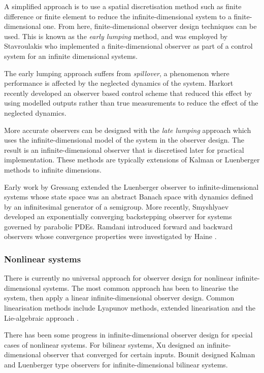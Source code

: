 A simplified approach is to use a spatial discretisation method such as finite difference or finite element to reduce the infinite-dimensional system to a finite-dimensional one. From here, finite-dimensional observer design techniques can be used. This is known as the \textit{early lumping} method, and was employed by Stavroulakis \cite{stavroulakis1973design} who implemented a finite-dimensional observer as part of a control system for an infinite dimensional systems.

The early lumping approach suffers from \textit{spillover}, a phenomenon where performance is affected by the neglected dynamics of the system\cite{meirovitch1983problem}. Harkort \cite{harkort2011finite} recently developed an observer based control scheme that reduced this effect by using modelled outputs rather than true measurements to reduce the effect of the neglected dynamics.

More accurate observers can be designed with the \textit{late lumping} approach which uses the infinite-dimensional model of the system in the observer design. The result is an infinite-dimensional observer that is discretised later for practical implementation. These methods are typically extensions of Kalman or Luenberger methods to infinite dimensions. 

Early work by Gressang \cite{gressang1975observers} extended the Luenberger observer to infinite-dimensional systems whose state space was an abstract Banach space with dynamics defined by an infinitesimal generator of a semigroup. More recently, Smyshlyaev \cite{smyshlyaev2005backstepping} developed an exponentially converging backstepping observer for systems governed by parabolic PDEs. Ramdani introduced forward and backward observers \cite{ramdani2010recovering} whose convergence properties were investigated by Haine \cite{haine2014recovering}.

\subsubsection{Nonlinear systems}
There is currently no universal approach for observer design for nonlinear infinite-dimensional systems.
The most common approach has been to linearise the system, then apply a linear infinite-dimensional observer design. Common linearisation methods include Lyapunov methods, extended linearisation and the Lie-algebraic approach \cite{primbs1996survey}.

There has been some progress in infinite-dimensional observer design for special cases of nonlinear systems. For bilinear systems, Xu \cite{xu1995observer} designed an infinite-dimensional observer that converged for certain inputs. Bounit \cite{bounit1997observers} designed Kalman and Luenberger type observers for infinite-dimensional bilinear systems. 

